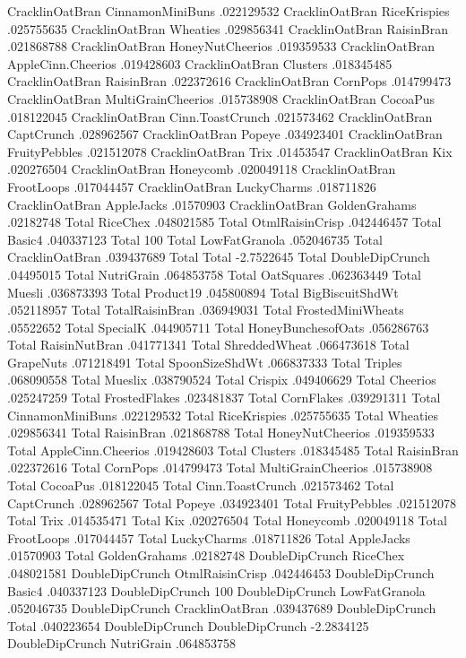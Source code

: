 CracklinOatBran	CinnamonMiniBuns	.022129532
CracklinOatBran	RiceKrispies	.025755635
CracklinOatBran	Wheaties	.029856341
CracklinOatBran	RaisinBran	.021868788
CracklinOatBran	HoneyNutCheerios	.019359533
CracklinOatBran	AppleCinn.Cheerios	.019428603
CracklinOatBran	Clusters	.018345485
CracklinOatBran	RaisinBran	.022372616
CracklinOatBran	CornPops	.014799473
CracklinOatBran	MultiGrainCheerios	.015738908
CracklinOatBran	CocoaPus	.018122045
CracklinOatBran	Cinn.ToastCrunch	.021573462
CracklinOatBran	CaptCrunch	.028962567
CracklinOatBran	Popeye	.034923401
CracklinOatBran	FruityPebbles	.021512078
CracklinOatBran	Trix	.01453547
CracklinOatBran	Kix	.020276504
CracklinOatBran	Honeycomb	.020049118
CracklinOatBran	FrootLoops	.017044457
CracklinOatBran	LuckyCharms	.018711826
CracklinOatBran	AppleJacks	.01570903
CracklinOatBran	GoldenGrahams	.02182748
Total	RiceChex	.048021585
Total	OtmlRaisinCrisp	.042446457
Total	Basic4	.040337123
Total	100%
Total	LowFatGranola	.052046735
Total	CracklinOatBran	.039437689
Total	Total	-2.7522645
Total	DoubleDipCrunch	.04495015
Total	NutriGrain	.064853758
Total	OatSquares	.062363449
Total	Muesli	.036873393
Total	Product19	.045800894
Total	BigBiscuitShdWt	.052118957
Total	TotalRaisinBran	.036949031
Total	FrostedMiniWheats	.05522652
Total	SpecialK	.044905711
Total	HoneyBunchesofOats	.056286763
Total	RaisinNutBran	.041771341
Total	ShreddedWheat	.066473618
Total	GrapeNuts	.071218491
Total	SpoonSizeShdWt	.066837333
Total	Triples	.068090558
Total	Mueslix	.038790524
Total	Crispix	.049406629
Total	Cheerios	.025247259
Total	FrostedFlakes	.023481837
Total	CornFlakes	.039291311
Total	CinnamonMiniBuns	.022129532
Total	RiceKrispies	.025755635
Total	Wheaties	.029856341
Total	RaisinBran	.021868788
Total	HoneyNutCheerios	.019359533
Total	AppleCinn.Cheerios	.019428603
Total	Clusters	.018345485
Total	RaisinBran	.022372616
Total	CornPops	.014799473
Total	MultiGrainCheerios	.015738908
Total	CocoaPus	.018122045
Total	Cinn.ToastCrunch	.021573462
Total	CaptCrunch	.028962567
Total	Popeye	.034923401
Total	FruityPebbles	.021512078
Total	Trix	.014535471
Total	Kix	.020276504
Total	Honeycomb	.020049118
Total	FrootLoops	.017044457
Total	LuckyCharms	.018711826
Total	AppleJacks	.01570903
Total	GoldenGrahams	.02182748
DoubleDipCrunch	RiceChex	.048021581
DoubleDipCrunch	OtmlRaisinCrisp	.042446453
DoubleDipCrunch	Basic4	.040337123
DoubleDipCrunch	100%
DoubleDipCrunch	LowFatGranola	.052046735
DoubleDipCrunch	CracklinOatBran	.039437689
DoubleDipCrunch	Total	.040223654
DoubleDipCrunch	DoubleDipCrunch	-2.2834125
DoubleDipCrunch	NutriGrain	.064853758
